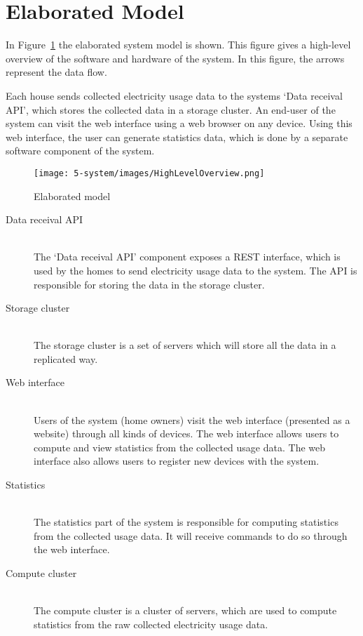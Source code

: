 \section{Elaborated Model}
\label{sec:elaboratedmodel}

In Figure~\ref{fig:elaboratedmodel} the elaborated system model is shown. This figure gives a high-level overview of the software and hardware of the system. In this figure, the arrows represent the data flow.

Each house sends collected electricity usage data to the systems `Data receival API', which stores the collected data in a storage cluster.
An end-user of the system can visit the web interface using a web browser on any device. Using this web interface, the user can generate statistics data, which is done by a separate software component of the system.


\begin{figure}[H]
	\centering
	\texttt{[image: 5-system/images/HighLevelOverview.png]}
	\caption{Elaborated model}
	\label{fig:elaboratedmodel}
\end{figure}

\begin{description}
	\item[Data receival API] ~\\ The `Data receival API' component exposes a REST interface, which is used by the homes to send electricity usage data to the system. The API is responsible for storing the data in the storage cluster.
	
	\item[Storage cluster] ~\\ The storage cluster is a set of servers which will store all the data in a replicated way.
	
	\item[Web interface] ~\\ Users of the system (home owners) visit the web interface (presented as a website) through all kinds of devices. The web interface allows users to compute and view statistics from the collected usage data. The web interface also allows users to register new devices with the system.
	
	\item[Statistics] ~\\ The statistics part of the system is responsible for computing statistics from the collected usage data. It will receive commands to do so through the web interface.
	
	\item[Compute cluster] ~\\ The compute cluster is a cluster of servers, which are used to compute statistics from the raw collected electricity usage data.
	
\end{description}
